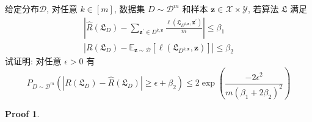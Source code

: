 \documentclass[a4paper,UTF8]{article}
\numberwithin{equation}{section}
\newtheorem*{myProof}{Proof}
\begin{document}
\noindent 给定分布$\mathcal{D}$, 对任意 $k \in[m]$, 数据集 $D\sim \mathcal{D}^{m}$ 和样本 $\boldsymbol{z} \in \mathcal{X} \times \mathcal{Y}$, 若算法 $\mathfrak{L}$ 满足
$$
\begin{array}{l}
	\left|\hat{R}\left(\mathfrak{L}_{D}\right)-\sum_{\boldsymbol{z}^{\prime} \in D^{k, \boldsymbol{z}}} \frac{\ell\left(\mathfrak{L}_{D^{k, \boldsymbol{z}}}, \boldsymbol{z}^{\prime}\right)}{m}\right| \leqslant \beta_{1} \\
	\left|R\left(\mathfrak{L}_{D}\right)-\mathbb{E}_{\boldsymbol{z} \sim \mathcal{D}}\left[\ell\left(\mathfrak{L}_{D^{k, \boldsymbol{z}}}, \boldsymbol{z}\right)\right]\right| \leqslant \beta_{2}
\end{array}
$$
试证明: 对任意 $\epsilon>0$ 有
$$
	P_{D \sim \mathcal{D}^{m}}\left(\left|R\left(\mathfrak{L}_{D}\right)-\hat{R}\left(\mathfrak{L}_{D}\right)\right| \geqslant \epsilon+\beta_{2}\right) \leqslant 2 \exp \left(\frac{-2 \epsilon^{2}}{m\left(\beta_{1}+2 \beta_{2}\right)^{2}}\right)
$$

\begin{myProof}~\\ 

\end{myProof}
\end{document}
